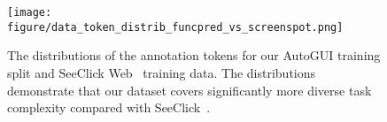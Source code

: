 \begin{figure}[t]
    \centering
    \texttt{[image: figure/data\_token\_distrib\_funcpred\_vs\_screenspot.png]}
    \caption{The distributions of the annotation tokens for our AutoGUI training split and SeeClick Web~\cite{cheng2024seeclick} training data. The distributions demonstrate that our dataset covers significantly more diverse task complexity compared with SeeClick~\cite{cheng2024seeclick}.}
    \label{fig: token distrib}
\end{figure}